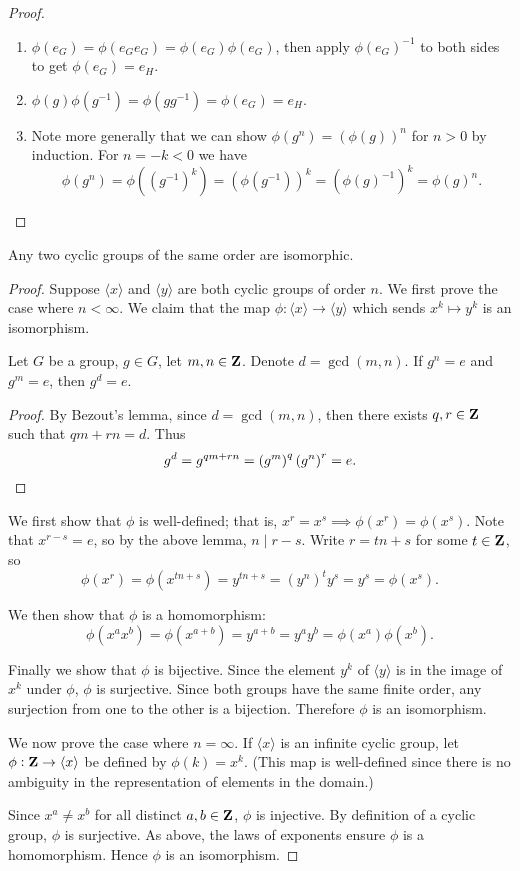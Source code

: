 \begin{proof} \
\begin{enumerate}[label=(\roman*)]
\item $\phi(e_G)=\phi(e_G e_G)=\phi(e_G)\phi(e_G)$, then apply $\phi(e_G)^{-1}$ to both sides to get $\phi(e_G)=e_H$.

\item $\phi(g)\phi(g^{-1})=\phi(gg^{-1})=\phi(e_G)=e_H$.

\item Note more generally that we can show $\phi(g^n)=(\phi(g))^n$ for $n>0$ by induction. For $n=-k<0$ we have
\[\phi(g^n)=\phi((g^{-1})^k)=(\phi(g^{-1}))^k=(\phi(g)^{-1})^k=\phi(g)^n.\]
\end{enumerate}
\end{proof}

\begin{theorem}
Any two cyclic groups of the same order are isomorphic.
\end{theorem}

\begin{proof}
Suppose $\langle x\rangle$ and $\langle y\rangle$ are both cyclic groups of order $n$. We first prove the case where $n<\infty$. We claim that the map $\phi:\langle x\rangle\to\langle y\rangle$ which sends $x^k\mapsto y^k$ is an isomorphism.
\begin{lemma*}
Let $G$ be a group, $g\in G$, let $m,n\in\mathbf Z$. Denote $d=\gcd(m,n)$. If $g^n=e$ and $g^m=e$, then $g^d=e$.
\end{lemma*}
\begin{proof}
By Bezout's lemma, since $d=\gcd(m,n)$, then there exists $q,r\in\mathbf Z$ such that $qm+rn=d$. Thus
\[g^d=g^{qm+rn}=\left(g^m\right)^q\left(g^n\right)^r=e.\]
\end{proof}
We first show that $\phi$ is well-defined; that is, $x^r=x^s\implies \phi(x^r)=\phi(x^s)$. Note that $x^{r-s}=e$, so by the above lemma, $n\mid r-s$. Write $r=tn+s$ for some $t\in\mathbf Z$, so
\[\phi(x^r)=\phi(x^{tn+s})=y^{tn+s}=(y^n)^ty^s=y^s=\phi(x^s).\]

We then show that $\phi$ is a homomorphism:
\[\phi(x^ax^b)=\phi(x^{a+b})=y^{a+b}=y^ay^b=\phi(x^a)\phi(x^b).\]

Finally we show that $\phi$ is bijective. Since the element $y^k$ of $\langle y\rangle$ is in the image of $x^k$ under $\phi$, $\phi$ is surjective. Since both groups have the same finite order, any surjection from one to the other is a bijection. Therefore $\phi$ is an isomorphism.

We now prove the case where $n=\infty$. If $\langle x\rangle$ is an infinite cyclic group, let $\phi:\mathbf Z\to\langle x\rangle$ be defined by $\phi(k)=x^k$. (This map is well-defined since there is no ambiguity in the representation of elements in the domain.)

Since $x^a\neq x^b$ for all distinct $a,b\in\mathbf Z$, $\phi$ is injective. By definition of a cyclic group, $\phi$ is surjective. As above, the laws of exponents ensure $\phi$ is a homomorphism. Hence $\phi$ is an isomorphism.
\end{proof}

